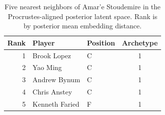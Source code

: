 \begin{table}[htbp]
  \centering\small
  \begin{tabular}{rllc}
    \toprule
    Rank & Player & Position & Archetype \\
    \midrule
    1 & Brook Lopez & C & 1 \\
    2 & Yao Ming & C & 1 \\
    3 & Andrew Bynum & C & 1 \\
    4 & Chris Anstey & C & 1 \\
    5 & Kenneth Faried & F & 1 \\
    \bottomrule
  \end{tabular}
  \caption{Five nearest neighbors of Amar'e Stoudemire in the Procrustes-aligned posterior latent space. Rank is by posterior mean embedding distance.}
  \label{tab:Amar_e_Stoudemire_neighbors}
\end{table}

